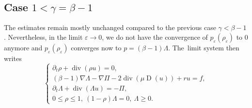 \documentclass[10pt]{amsart}
\newcommand{\<}{\bigl\langle}
\renewcommand{\>}{\bigr\rangle}
\newcommand{\labeleq}[1]{}
\newenvironment{subnumcasess}{\begin{equation*}\begin{cases}}{\end{cases}\end{equation*}}
\theoremstyle{definition}
\theoremstyle{remark}
\DeclareMathOperator{\Div}{div}
\DeclareMathOperator{\D}{D}
\let\ep\varepsilon
\begin{document}
\subsection{Case $1<\gamma = \beta-1$}
The estimates remain mostly unchanged compared to the previous case $\gamma < \beta-1$.
Nevertheless, in the limit $\ep \rightarrow 0$, we do not have the convergence of $p_\ep(\rho_\ep)$ to $0$ anymore and $p_\ep(\rho_\ep)$ converges now to $p = (\beta-1) \Lambda$.
The~limit system then writes
\begin{subnumcasess}{\labeleq{xxx2}}
\partial_t \rho + \Div (\rho u) = 0, \\
(\beta-1)\nabla \Lambda - \nabla \Pi - 2 \Div(\mu \D(u)) + ru = f, \\
\partial_t \Lambda + \Div(\Lambda u) = -\Pi,\\
0 \leq \rho \leq 1, ~(1-\rho)\Lambda = 0,~ \Lambda \geq 0.
\end{subnumcasess}%
\end{document}
